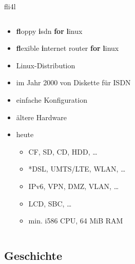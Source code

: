 \documentclass[t]{beamer}
\makeatletter
\newcommand{\strong}[1]{\@strong{#1}}
\newcommand{\@@strong}[1]{\textbf{\let\@strong\@@@strong#1}}
\newcommand{\@@@strong}[1]{\textnormal{\let\@strong\@@strong#1}}
\let\@strong\@@strong
\makeatother
\begin{document}
\begin{frame}{fli4l}
    \begin{columns}[T]
        \begin{column}{0.6\textwidth}
            \begin{itemize}
                \item \strong{fl}oppy \strong{i}sdn \strong{for} \strong{l}inux
                \item \strong{fl}exible \strong{i}nternet router \strong{for} \strong {l}inux
                \item Linux-Distribution
                \item im Jahr 2000 von Diskette für ISDN
                \item einfache Konfiguration
                \item ältere Hardware
                \item heute
                    \begin{itemize}
                        \item CF, SD, CD, HDD, …
                        \item *DSL, UMTS/LTE, WLAN, …
                        \item IPv6, VPN, DMZ, VLAN, …
                        \item LCD, SBC, …
                        \item min. i586 CPU, 64 MiB RAM
                    \end{itemize}
            \end{itemize}
        \end{column}
        \begin{column}{0.4\textwidth}
            \begin{figure}
                
            \end{figure}
        \end{column}
    \end{columns}
\end{frame}

\subsection{Geschichte}
\end{document}
